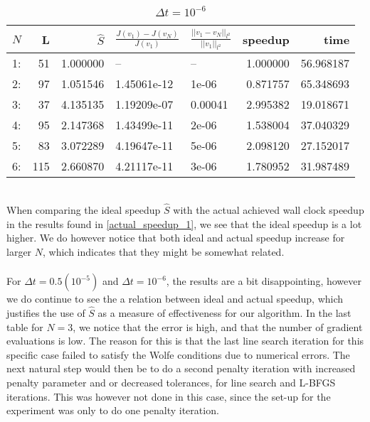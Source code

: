 \begin{table}[h]
\centering
\caption{$\Delta t = 10^{-6}$}
\label{actual_speedup_3}
\begin{tabular}{lrrllrr}
\toprule
{} $N$&   L &        $\hat S$ &          $\frac{J(v_1)-J(v_N)}{J(v_1)}$ &    $\frac{||v_1-v_N||_{l^2}}{||v_1||_{l^2}}$&speedup &       time \\
\midrule
1: &   51 &  1.000000 &           -- &       -- &  1.000000 &  56.968187 \\
2: &   97 &  1.051546 &  1.45061e-12 &    1e-06 &  0.871757 &  65.348693 \\
3: &   37 &  4.135135 &  1.19209e-07 &  0.00041 &  2.995382 &  19.018671 \\
4: &   95 &  2.147368 &  1.43499e-11 &    2e-06 &  1.538004 &  37.040329 \\
5: &   83 &  3.072289 &  4.19647e-11 &    5e-06 &  2.098120 &  27.152017 \\
6: &  115 &  2.660870 &  4.21117e-11 &    3e-06 &  1.780952 &  31.987489 \\
\bottomrule
\end{tabular}
\end{table}
\\
When comparing the ideal speedup $\hat S$ with the actual achieved wall clock speedup in the results found in \ref{actual_speedup_1}, we see that the ideal speedup is a lot higher. We do however notice that both ideal and actual speedup increase for larger $N$, which indicates that they might be somewhat related.
\\
\\
For $\Delta t = 0.5(10^{-5})$ and $\Delta t = 10^{-6}$, the results are a bit disappointing, however we do continue to see the a relation between ideal and actual speedup, which justifies the use of $\hat S$ as a measure of effectiveness for our algorithm. In the last table for $N=3$, we notice that the error is high, and that the number of gradient evaluations is low. The reason for this is that the last line search iteration for this specific case failed to satisfy the Wolfe conditions due to numerical errors. The next natural step would then be to do a second penalty iteration with increased penalty parameter and or decreased tolerances, for line search and L-BFGS iterations. This was however not done in this case, since the set-up for the experiment was only to do one penalty iteration.
